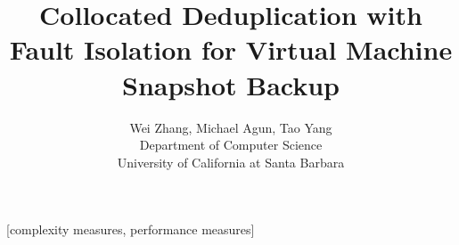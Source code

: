 \documentclass{acm_proc_article-sp}
\begin{document}
\title{Collocated Deduplication with Fault Isolation for Virtual Machine Snapshot Backup}



\author{
Wei Zhang, Michael Agun,  Tao Yang \\
Department of Computer Science\\
University of California at Santa Barbara
}



\maketitle



[complexity measures, performance measures]




%

%
%
%
%


%
%
%
%




\end{document}
